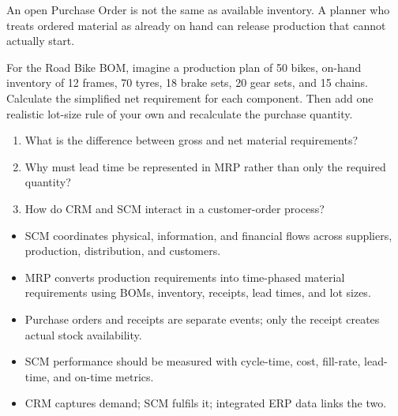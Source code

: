 \begin{pitfall}
An open Purchase Order is not the same as available inventory. A planner who treats ordered material as already on hand can release production that cannot actually start.
\end{pitfall}

\begin{tryit}
For the Road Bike BOM, imagine a production plan of 50 bikes, on-hand inventory of 12 frames, 70 tyres, 18 brake sets, 20 gear sets, and 15 chains. Calculate the simplified net requirement for each component. Then add one realistic lot-size rule of your own and recalculate the purchase quantity.
\end{tryit}

\begin{quickcheck}
\begin{enumerate}
  \item What is the difference between gross and net material requirements?
  \item Why must lead time be represented in MRP rather than only the required quantity?
  \item How do CRM and SCM interact in a customer-order process?
\end{enumerate}
\end{quickcheck}

\begin{chapterrecap}
\begin{itemize}
  \item SCM coordinates physical, information, and financial flows across suppliers, production, distribution, and customers.
  \item MRP converts production requirements into time-phased material requirements using BOMs, inventory, receipts, lead times, and lot sizes.
  \item Purchase orders and receipts are separate events; only the receipt creates actual stock availability.
  \item SCM performance should be measured with cycle-time, cost, fill-rate, lead-time, and on-time metrics.
  \item CRM captures demand; SCM fulfils it; integrated ERP data links the two.
\end{itemize}
\end{chapterrecap}
